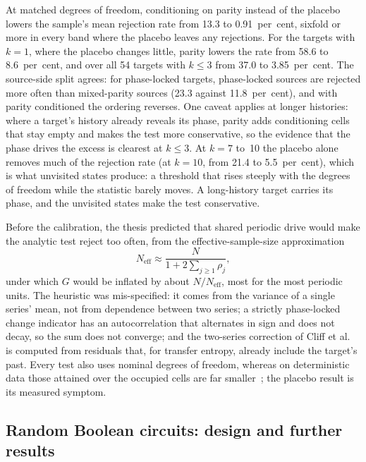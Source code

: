 At matched degrees of freedom, conditioning on parity instead of the placebo lowers the sample's mean rejection rate from 13.3 to 0.91~per~cent, sixfold or more in every band where the placebo leaves any rejections. For the targets with $k = 1$, where the placebo changes little, parity lowers the rate from 58.6 to 8.6~per~cent, and over all 54 targets with $k \le 3$ from 37.0 to 3.85~per~cent. The source-side split agrees: for phase-locked targets, phase-locked sources are rejected more often than mixed-parity sources (23.3 against 11.8~per~cent), and with parity conditioned the ordering reverses. One caveat applies at longer histories: where a target's history already reveals its phase, parity adds conditioning cells that stay empty and makes the test more conservative, so the evidence that the phase drives the excess is clearest at $k \le 3$. At $k = 7$ to~10 the placebo alone removes much of the rejection rate (at $k = 10$, from 21.4 to 5.5~per~cent), which is what unvisited states produce: a threshold that rises steeply with the degrees of freedom while the statistic barely moves. A long-history target carries its phase, and the unvisited states make the test conservative.

Before the calibration, the thesis predicted that shared periodic drive would make the analytic test reject too often, from the effective-sample-size approximation
\begin{equation}
  N_{\mathrm{eff}} \approx \frac{N}{1 + 2\sum_{j \ge 1} \rho_j},
  \label{eq:neff}
\end{equation}
under which $G$ would be inflated by about $N/N_{\mathrm{eff}}$, most for the most periodic units. The heuristic was mis-specified: it comes from the variance of a single series' mean, not from dependence between two series; a strictly phase-locked change indicator has an autocorrelation that alternates in sign and does not decay, so the sum does not converge; and the two-series correction of Cliff et al.~\cite{cliff2021assessing} is computed from residuals that, for transfer entropy, already include the target's past. Every test also uses nominal degrees of freedom, whereas on deterministic data those attained over the occupied cells are far smaller~\cite{panzeri1996bias,panzeri2007correcting}; the placebo result is its measured symptom.


\subsection{Random Boolean circuits: design and further results}
\label{sec:v-boolean-detail}

